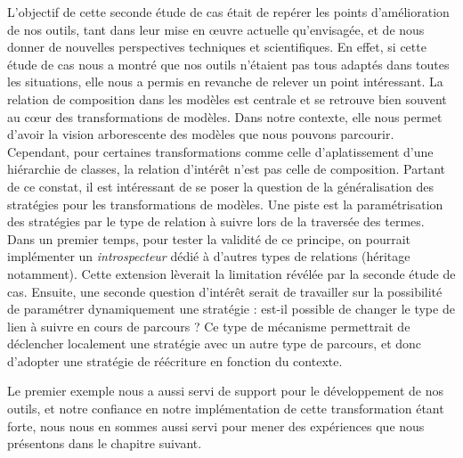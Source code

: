 L'objectif de cette seconde étude de cas était de repérer les points
d'amélioration de nos outils, tant dans leur mise en œuvre actuelle
qu'envisagée, et de nous donner de nouvelles perspectives techniques et
scientifiques. En effet, si cette étude de cas nous a montré que nos outils
n'étaient pas tous adaptés dans toutes les situations, elle nous a permis en
revanche de relever un point intéressant. La relation de composition dans les
modèles est centrale et se retrouve bien souvent au cœur des transformations de
modèles. Dans notre contexte, elle nous permet d'avoir la vision arborescente
des modèles que nous pouvons parcourir. Cependant, pour certaines
transformations comme celle d'aplatissement d'une hiérarchie de classes, la
relation d'intérêt n'est pas celle de composition. Partant de ce constat, il
est intéressant de se poser la question de la généralisation des stratégies
pour les transformations de modèles. Une piste est la paramétrisation des
stratégies par le type de relation à suivre lors de la traversée des termes.
Dans un premier temps, pour tester la validité de ce principe, on pourrait
implémenter un \emph{introspecteur} dédié à d'autres types de relations
(héritage notamment). Cette extension lèverait la limitation révélée par la
seconde étude de cas. Ensuite, une seconde question d'intérêt serait de
travailler sur la possibilité de paramétrer dynamiquement une stratégie :
est-il possible de changer le type de lien à suivre en cours de parcours ? %
Ce type de mécanisme permettrait de déclencher localement une stratégie avec un
autre type de parcours, et donc d'adopter une stratégie de réécriture en
fonction du contexte.

Le premier exemple nous a aussi servi de support pour le développement de nos
outils, et notre confiance en notre implémentation de cette transformation
étant forte, nous nous en sommes aussi servi pour mener des expériences que
nous présentons dans le chapitre suivant.%


